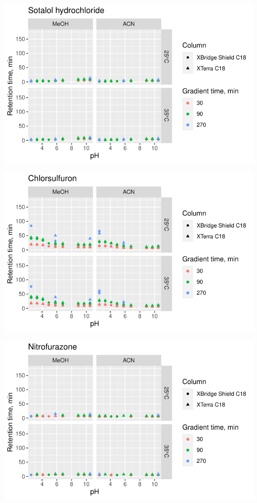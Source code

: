 \documentclass[
  letterpaper,
  DIV=11,
  numbers=noendperiod]{scrreprt}
\begin{document}
\includegraphics{index_files/figure-pdf/unnamed-chunk-4-141.pdf}

\includegraphics{index_files/figure-pdf/unnamed-chunk-4-142.pdf}

\includegraphics{index_files/figure-pdf/unnamed-chunk-4-143.pdf}
\end{document}
